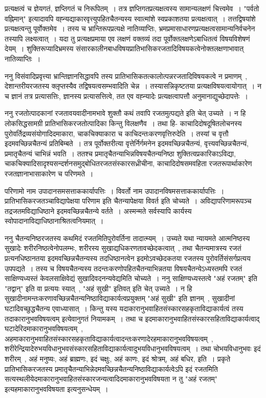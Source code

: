 	प्रत्यक्षत्वं च ज्ञेयगतं, ज्ञप्तिगतं च निरूपितम्~। तत्र ज्ञप्तिगतप्रत्यक्षत्वस्य सामान्यलक्षणं चित्त्वमेव~। "पर्वतो वह्निमान्" इत्यादावपि वह्न्यद्याकारवृत्त्युपहितचैतन्यस्य स्वात्मांशे स्वप्रकाशतया प्रत्यक्षत्वात्~। तत्तद्विषयांशे प्रत्यक्षत्वन्तु पूर्वोक्तमेव~। तस्य च भ्रान्तिरूपप्रत्यक्षे नातिव्याप्तिः, भ्रमप्रमासाधारणप्रत्यक्षत्वसामान्यनिर्वचनेन तस्यापि लक्ष्यत्वात्~। यदा तु प्रत्यक्षप्रमाया एव लक्षणं वक्तव्यं तदा पूर्वोक्तलक्षणेऽबाधितत्वं विषयविशेषणं देयम्~। शुक्तिरूप्यादिभ्रमस्य संसारकालीनबाधविषयप्रातिभासिकरजतादिविषयकत्वेनोक्तलक्षणाभावात् नातिव्याप्तिः~।\par
	ननु विसंवादिप्रवृत्त्या भ्रान्तिज्ञानसिद्धावपि तस्य प्रातिभासिकतत्कालोत्पन्नरजतादिविषयकत्वे न प्रमाणम्~, देशान्तरीयरजतस्य क्लृप्तस्यैव तद्विषयत्वसम्भवादिति चेन्न~। तस्यासन्निकृष्टतया प्रत्यक्षविषयत्वायोगात्~। न च ज्ञानं तत्र प्रत्यासत्तिः, ज्ञानस्य प्रत्यासत्तित्वे, तत एव वह्न्यादेः प्रत्यक्षत्वापत्तौ अनुमानाद्युच्छेदापत्तेः~।\par
	ननु रजतोत्पादकानां रजतावयवादीनामभावे शुक्तौ कथं तवापि रजतमुत्पद्यते इति चेत् उच्यते~। न हि लोकसिद्धसामग्री प्रातिभासिकरजतोत्पादिका किन्तु विलक्षणैव~। तथा हि- काचादिदोषदूषितलोचनस्य पुरोवर्तिद्रव्यसंयोगादिदमाकारा, चाकचिक्याकारा च काचिदन्तःकरणवृत्तिरुदेति~। तस्यां च वृत्तौ इदमवच्छिन्नचैतन्यं प्रतिबिम्बते~। तत्र पूर्वोक्तरीत्या वृत्तेर्निर्गमनेन इदमवच्छिन्नचैतन्यं, वृत्त्यवच्छिन्नचैतन्यं, प्रमातृचैतन्यं चाभिन्नं भवति~। ततश्च प्रमातृचैतन्याभिन्नविषयचैतन्यनिष्ठा शुक्तित्वप्रकारिकाऽविद्या, चाकचिक्यादिसादृश्यसन्दर्शनसमुद्बोधितरजतसंस्कारसध्रीचीना, काचादिदोषसमवहिता रजतरूपार्थाकारेण रजतज्ञानाभासाकारेण च परिणमते~।\par
	परिणामो नाम उपादानसमसत्ताककार्यापत्तिः~। विवर्तो नाम उपादानविषमसत्ताककार्यापत्तिः~। प्रातिभासिकरजतञ्चाविद्यापेक्षया परिणाम इति चैतन्यापेक्षया विवर्त इति चोच्यते~। अविद्यापरिणामरूपञ्च तद्रजतमविद्याधिष्ठाने इदमवच्छिन्नचैतन्ये वर्तते~। अस्मन्मते सर्वस्यापि कार्यस्य स्वोपादानाविद्याधिष्ठानाश्रितत्वनियमात्~।\par
	ननु चैतन्यनिष्ठरजतस्य कथमिदं रजतमितिपुरोवर्तिना तादात्म्यम्~। उच्यते यथा न्यायमते आत्मनिष्ठस्य सुखादेः शरीरनिष्ठत्वेनोपलम्भः, शरीरस्य सुखाद्यधिकरणतावच्छेदकत्वात्~, तथा चैतन्यमात्रस्य रजतं प्रत्यनधिष्ठानतया इदमवच्छिन्नचैतन्यस्य तदधिष्ठानत्वेन इदमोऽवच्छेदकतया रजतस्य पुरोवर्तिसंसर्गप्रत्यय उपपद्यते~। तस्य च विषयचैतन्यस्य तदन्तःकरणोपहितचैतन्याभिन्नतया विषयचैतन्येऽध्यस्तमपि रजतं साक्षिण्यध्यस्तं केवलसाक्षिवेद्यं सुखादिवदनन्यवेद्यमिति चोच्यते~। ननु साक्षिण्यध्यस्तत्वे "अहं रजतम्" इति "तद्वान्" इति वा प्रत्ययः स्यात्~, "अहं सुखी" इतिवत् इति चेत् उच्यते~। न हि सुखादीनामन्तःकरणावच्छिन्नचैतन्यनिष्ठाविद्याकार्यत्वप्रयुक्तम् "अहं सुखी" इति ज्ञानम्~, सुखादीनां घटादिवच्छुद्धचैतन्य एवाध्यासात्~। किन्तु यस्य यदाकारानुभवाहितसंस्कारसहकृताविद्याकार्यत्वं तस्य तदाकारानुभवविषयत्वम् इत्येवानुगतं नियामकम्~। तथा च इदमाकारानुभवाहितसंस्कारसहिताविद्याकार्यत्वाद् घटादेरिदमाकारानुभवविषयत्वम्~, अहमाकारानुभवाहितसंस्कारसहकृताविद्याकार्यत्वादन्तःकरणादेरहमाकारानुभवविषयत्वम्~, शरीरेन्द्रियादेरुभयविधानुभवसंस्कारसहिताविद्याकार्यत्वादुभयविधानुभवविषयत्वम्~। तथा चोभयविधानुभवः इदं शरीरम्~, अहं मनुष्यः, अहं ब्राह्मणः, इदं चक्षुः, अहं काणः, इदं श्रोत्रम्, अहं बधिर, इति~। प्रकृते प्रातिभासिकरजतस्य प्रमातृचैतन्याभिन्नेदमवच्छिन्नचैतन्यनिष्ठाविद्याकार्यत्वेऽपि इदं रजतमिति सत्यस्थलीयेदमाकारानुभवाहितसंस्कारजन्यत्वादिदमाकारानुभवविषयता न तु "अहं रजतम्" इत्यहमाकारानुभवविषयता इत्यनुसन्धेयम्~। \par
